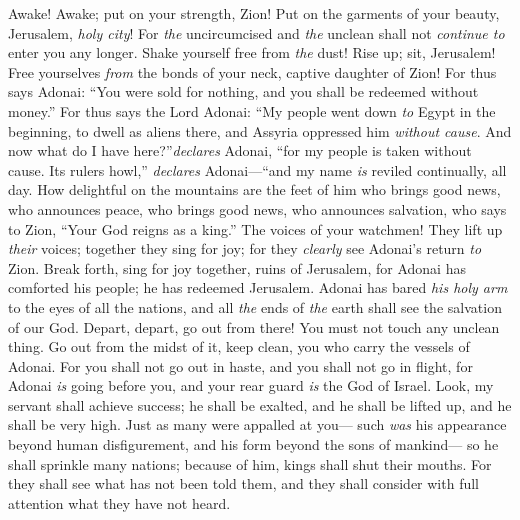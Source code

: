 \begin{biblechapter} %
 Awake! Awake; put on your strength, Zion! 
Put on the garments of your beauty, Jerusalem, \textit{holy city}! 
For \textit{the} uncircumcised and \textit{the} unclean shall not \textit{continue to} enter you any longer.
\verse Shake yourself free from \textit{the} dust! Rise up; sit, Jerusalem! 
Free yourselves \textit{from} the bonds of your neck, captive daughter of Zion!
\verse For thus says Adonai: “You were sold for nothing, 
and you shall be redeemed without money.”
\verse For thus says the Lord Adonai:
\verse “My people went down \textit{to} Egypt in the beginning, to dwell as aliens there, and Assyria oppressed him \textit{without cause}.
\verse And now what do I have here?”\textit{declares} Adonai, “for my people is taken without cause. Its rulers howl,” \textit{declares} Adonai—“and my name \textit{is} reviled continually, all day.
\verse How delightful on the mountains are the feet of him who brings good news, 
who announces peace, who brings good news, who announces salvation, 
who says to Zion, “Your God reigns as a king.”
\verse The voices of your watchmen! They lift up \textit{their} voices; 
together they sing for joy; 
for they \textit{clearly} see Adonai’s return \textit{to} Zion.
\verse Break forth, 
sing for joy together, ruins of Jerusalem, 
for Adonai has comforted his people; 
he has redeemed Jerusalem.
\verse Adonai has bared \textit{his holy arm} to the eyes of all the nations, 
and all \textit{the} ends of \textit{the} earth shall see the salvation of our God.
\verse Depart, depart, go out from there! You must not touch any unclean thing. 
Go out from the midst of it, keep clean, you who carry the vessels of Adonai.
\verse For you shall not go out in haste, 
and you shall not go in flight, 
for Adonai \textit{is} going before you, 
and your rear guard \textit{is} the God of Israel.
 Look, my servant shall achieve success; 
he shall be exalted, 
and he shall be lifted up, 
and he shall be very high.
\verse Just as many were appalled at you— 
such \textit{was} his appearance beyond human disfigurement, 
and his form beyond the sons of mankind—
\verse so he shall sprinkle many nations; 
because of him, kings shall shut their mouths. 
For they shall see what has not been told them, 
and they shall consider with full attention what they have not heard.
\end{biblechapter}

